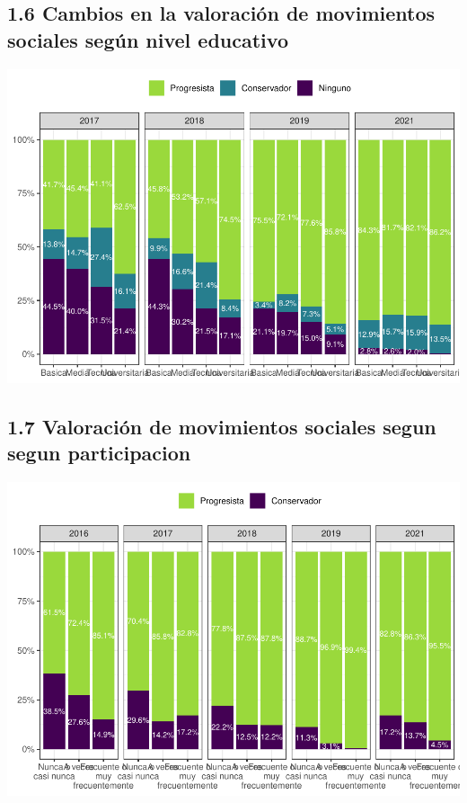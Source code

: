 \documentclass[
  12pt,
]{book}
\begin{document}
\hypertarget{cambios-en-la-valoraciuxf3n-de-movimientos-sociales-seguxfan-nivel-educativo}{%
\subsection{1.6 Cambios en la valoración de movimientos sociales según nivel educativo}\label{cambios-en-la-valoraciuxf3n-de-movimientos-sociales-seguxfan-nivel-educativo}}

\includegraphics{reporte-elsoc_files/figure-latex/unnamed-chunk-11-1.pdf}

\hypertarget{valoraciuxf3n-de-movimientos-sociales-segun-segun-participacion}{%
\subsection{1.7 Valoración de movimientos sociales segun segun participacion}\label{valoraciuxf3n-de-movimientos-sociales-segun-segun-participacion}}

\includegraphics{reporte-elsoc_files/figure-latex/unnamed-chunk-12-1.pdf}
\end{document}
